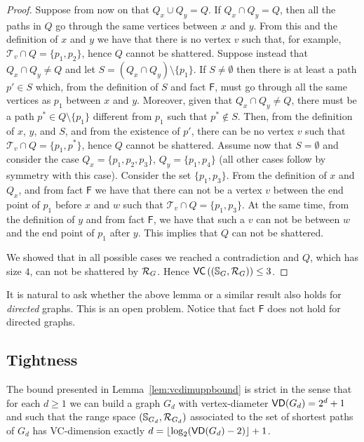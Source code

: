 \begin{proof}
  Suppose from now on that $Q_x\cup Q_y=Q$.  If $Q_x\cap Q_y=Q$, then
  all the paths in $Q$ go through the same vertices between $x$ and $y$. From
  this and the definition of $x$ and $y$ we have that there is no vertex $v$
  such that, for example, $\mathcal{T}_v\cap Q=\{p_1,p_2\}$, hence $Q$ cannot be
  shattered. Suppose instead that $Q_x\cap Q_y\neq Q$ and let $S=(Q_x\cap
  Q_y)\setminus\{p_1\}$. If $S\neq\emptyset$ then there is at least a path
  $p'\in S$ which, from the definition of $S$ and fact $\mathsf{F}$, must go
  through all the same vertices as $p_1$ between $x$ and $y$. Moreover, given
  that $Q_x\cap Q_y\neq Q$, there must be a path $p^*\in Q\setminus\{p_1\}$
  different from $p_1$ such that $p^*\notin S$. Then, from the definition of
  $x$, $y$, and $S$, and from the existence of $p'$, there can be no vertex $v$
  such that $\mathcal{T}_v\cap Q=\{p_1,p^*\}$, hence $Q$ cannot be shattered.
  Assume now that $S=\emptyset$ and consider the case $Q_x=\{p_1,p_2,p_3\}$,
  $Q_y=\{p_1,p_4\}$ (all other cases follow by symmetry with this case).
  Consider the set $\{p_1,p_3\}$. From the definition of $x$ and $Q_x$, and from
  fact $\mathsf{F}$ we have that there can not be a vertex $v$ between the end
  point of $p_1$ before $x$ and $w$ such that $\mathcal{T}_v\cap Q=\{p_1,p_3\}$.
  At the same time, from the definition of $y$ and from fact $\mathsf{F}$, we
  have that such a $v$ can not be between $w$ and the end point of $p_1$ after
  $y$. This implies that $Q$ can not be shattered.

  We showed that in all possible cases we reached a contradiction and $Q$,
  which has size $4$, can not be shattered by $\mathcal{R}_G$. Hence
  $\mathsf{VC}\left((\mathbb{S}_G,\mathcal{R}_G)\right)\le 3$.
\end{proof}

It is natural to ask whether the above lemma or a similar result also holds for
\emph{directed} graphs. This is an open problem. Notice that fact $\mathsf{F}$
does not hold for directed graphs.

\subsection{Tightness}\label{sec:centrsampltightness}
The bound presented in Lemma~\ref{lem:vcdimuppbound} is strict in the sense that
for each $d\ge 1$ we can build a graph $G_d$ with vertex-diameter
$\mathsf{VD}(G_d)=2^d+1$ and such that the range space $(\mathbb{S}_{G_d},\mathcal{R}_{G_d})$ associated to the set of
shortest paths of $G_d$ has VC-dimension exactly
$d=\lfloor\log_2(\mathsf{VD}(G_d)-2)\rfloor+1$. 

